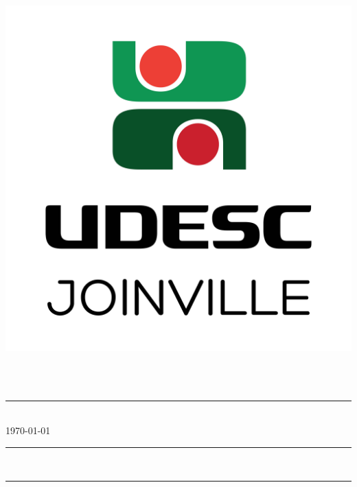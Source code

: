 \thispagestyle{empty}
\center
\begin{minipage}[!]{\linewidth}
	\begin{minipage}[!]{.19\linewidth}
		\includegraphics[width=\textwidth]{img/Marca Joinville Vertical RGB-01.jpg}				
	\end{minipage}
	\begin{minipage}[!]{.8\linewidth}
		\center
		\textsf{
			\large{
				\instituicao \\ \vspace{0.1cm}
				\centro \\ \vspace{0.17cm}
				\departamento
			}	
		}		
	\end{minipage}
	\center
	\rule{\textwidth}{1pt}	
	\textsc{\autor} \\
	\today \\ 
	\rule{\textwidth}{1pt}	
\end{minipage}
\begin{center}
   \textbf{\titulo}\\  
   \rule{.3\textwidth}{0.1pt}
\end{center}
\renewcommand{\thesection}{\Roman{section}}


